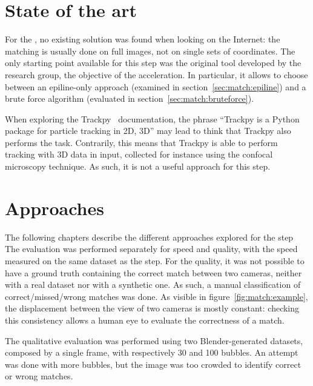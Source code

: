 \section{State of the art}

For the \match*, no existing solution was found when looking on the Internet: the matching is usually done on full images, not on single sets of coordinates.
The only starting point available for this step was the original tool developed by the research group, the objective of the acceleration.
In particular, it allows to choose between an epiline-only approach (examined in section~\ref{sec:match:epiline}) and a brute force algorithm (evaluated in section~\ref{sec:match:bruteforce}).

When exploring the Trackpy~\cite{trackpy} documentation, the phrase ``Trackpy is a Python package for particle tracking in 2D, 3D'' may lead to think that Trackpy also performs the \match* task.
Contrarily, this means that Trackpy is able to perform tracking with 3D data in input, collected for instance using the confocal microscopy technique.
As such, it is not a useful approach for this step.

\section{Approaches}

The following chapters describe the different approaches explored for the \match* step
The evaluation was performed separately for speed and quality, with the speed measured on the same dataset as the \linkDD* step.
For the quality, it was not possible to have a ground truth containing the correct match between two cameras, neither with a real dataset nor with a synthetic one.
As such, a manual classification of correct/missed/wrong matches was done.
As visible in figure~\ref{fig:match:example}, the displacement between the view of two cameras is mostly constant: checking this consistency allows a human eye to evaluate the correctness of a match.

The qualitative evaluation was performed using two Blender-generated datasets, composed by a single frame, with respectively 30 and 100 bubbles.
An attempt was done with more bubbles, but the image was too crowded to identify correct or wrong matches.

